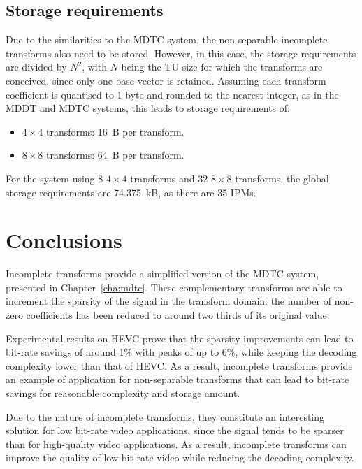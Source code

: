 \documentclass[11pt,a4paper,openright,twoside]{book}
\numberwithin{equation}{section} %
\numberwithin{figure}{section} %
\numberwithin{table}{section} %
\begin{document}
\subsection{Storage requirements}
\label{sub:it_storage_requirements}

Due to the similarities to the \ac{MDTC} system, the non-separable incomplete
transforms also need to be stored.
However, in this case, the storage requirements are divided by $N^2$, with $N$
being the \ac{TU} size for which the transforms are conceived, since only one
base vector is retained.
Assuming each transform coefficient is quantised to 1 byte and rounded to the
nearest integer, as in the \ac{MDDT} and \ac{MDTC} systems, this leads to
storage requirements of:
\begin{itemize}
	\item $4\times4$ transforms: \SI{16}{B} per transform.
	\item $8\times8$ transforms: \SI{64}{B} per transform.
\end{itemize}
For the system using 8 $4\times4$ transforms and 32 $8\times8$ transforms, the
global storage requirements are \SI{74.375}{\kilo B}, as there are 35
\acp{IPM}.

\section{Conclusions}
\label{sec:it_conclusions}

Incomplete transforms provide a simplified version of the \ac{MDTC} system,
presented in Chapter~\ref{cha:mdtc}.
These complementary transforms are able to increment the sparsity of the
signal in the transform domain:
the number of non-zero coefficients has been reduced to around two thirds of
its original value.

Experimental results on \ac{HEVC} prove that the sparsity improvements can
lead to bit-rate savings of around 1\% with peaks of up to 6\%, while keeping
the decoding complexity lower than that of \ac{HEVC}.
As a result, incomplete transforms provide an example of application for
non-separable transforms that can lead to bit-rate savings for reasonable
complexity and storage amount.

Due to the nature of incomplete transforms, they constitute an interesting
solution for low bit-rate video applications, since the signal tends to be
sparser than for high-quality video applications.
As a result, incomplete transforms can improve the quality of low bit-rate
video while reducing the decoding complexity.
\end{document}
